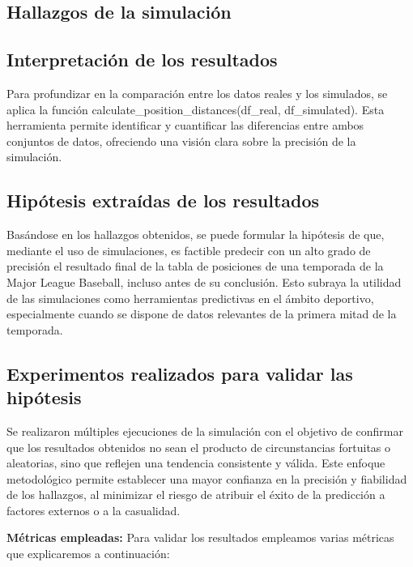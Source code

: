 \documentclass{article}
\begin{document}
        \subsection{Hallazgos de la simulación}

        \subsection{Interpretación de los resultados}
            Para profundizar en la comparación entre los datos reales y los simulados, se aplica la función calculate\_position\_distances(df\_real, df\_simulated). Esta herramienta permite identificar y cuantificar las diferencias entre ambos conjuntos de datos, ofreciendo una visión clara sobre la precisión de la simulación.

        \subsection{Hipótesis extraídas de los resultados}
            Basándose en los hallazgos obtenidos, se puede formular la hipótesis de que, mediante el uso de simulaciones, es factible predecir con un alto grado de precisión el resultado final de la tabla de posiciones de una temporada de la Major League Baseball, incluso antes de su conclusión. Esto subraya la utilidad de las simulaciones como herramientas predictivas en el ámbito deportivo, especialmente cuando se dispone de datos relevantes de la primera mitad de la temporada.

        \subsection{Experimentos realizados para validar las hipótesis}
            Se realizaron múltiples ejecuciones de la simulación con el objetivo de confirmar que los resultados obtenidos no sean el producto de circunstancias fortuitas o aleatorias, sino que reflejen una tendencia consistente y válida. Este enfoque metodológico permite establecer una mayor confianza en la precisión y fiabilidad de los hallazgos, al minimizar el riesgo de atribuir el éxito de la predicción a factores externos o a la casualidad.

            \textbf{Métricas empleadas:}
            Para validar los resultados empleamos varias métricas que explicaremos a continuación:
\end{document}
